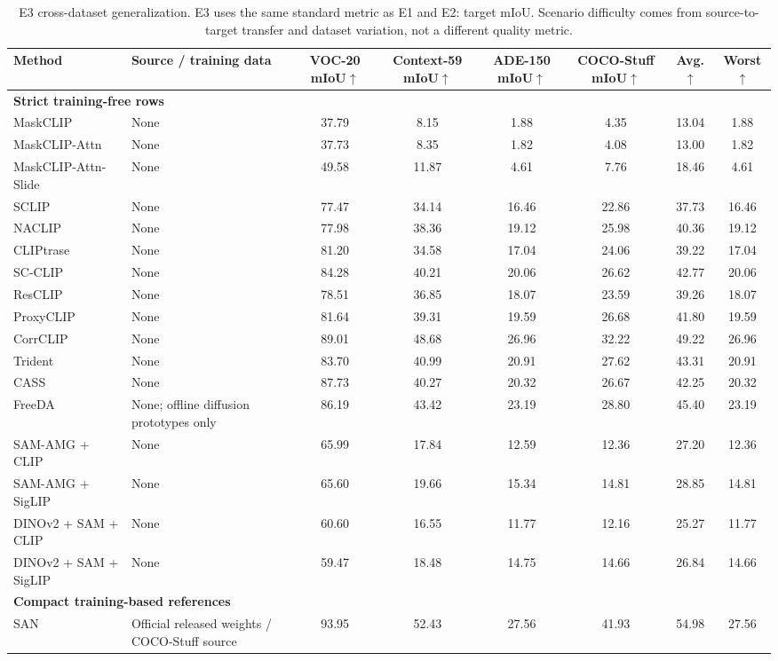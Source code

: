 \documentclass[11pt,a4paper]{article}
\newcommand{\up}{\ensuremath{\uparrow}}
\begin{document}
\begin{table}[H]
\centering
\scriptsize
\caption{E3 cross-dataset generalization. E3 uses the same standard metric as E1 and E2: target mIoU. Scenario difficulty comes from source-to-target transfer and dataset variation, not a different quality metric.}
\label{tab:e3-generalization}
\setlength{\tabcolsep}{2.5pt}
\begin{adjustbox}{max width=\textwidth}
\begin{tabular}{l p{} c c c c c c}
\toprule
Method & Source / training data & VOC-20 mIoU\up & Context-59 mIoU\up & ADE-150 mIoU\up & COCO-Stuff mIoU\up & Avg.\up & Worst\up \\
\midrule
\multicolumn{8}{l}{\textbf{Strict training-free rows}} \\
MaskCLIP & None & 37.79 & 8.15 & 1.88 & 4.35 & 13.04 & 1.88 \\
MaskCLIP-Attn & None & 37.73 & 8.35 & 1.82 & 4.08 & 13.00 & 1.82 \\
MaskCLIP-Attn-Slide & None & 49.58 & 11.87 & 4.61 & 7.76 & 18.46 & 4.61 \\
SCLIP & None & 77.47 & 34.14 & 16.46 & 22.86 & 37.73 & 16.46 \\
NACLIP & None & 77.98 & 38.36 & 19.12 & 25.98 & 40.36 & 19.12 \\
CLIPtrase & None & 81.20 & 34.58 & 17.04 & 24.06 & 39.22 & 17.04 \\
SC-CLIP & None & 84.28 & 40.21 & 20.06 & 26.62 & 42.77 & 20.06 \\
ResCLIP & None & 78.51 & 36.85 & 18.07 & 23.59 & 39.26 & 18.07 \\
ProxyCLIP & None & 81.64 & 39.31 & 19.59 & 26.68 & 41.80 & 19.59 \\
CorrCLIP & None & 89.01 & 48.68 & 26.96 & 32.22 & 49.22 & 26.96 \\
Trident & None & 83.70 & 40.99 & 20.91 & 27.62 & 43.31 & 20.91 \\
CASS & None & 87.73 & 40.27 & 20.32 & 26.67 & 42.25 & 20.32 \\
FreeDA & None; offline diffusion prototypes only & 86.19 & 43.42 & 23.19 & 28.80 & 45.40 & 23.19 \\
SAM-AMG + CLIP & None & 65.99 & 17.84 & 12.59 & 12.36 & 27.20 & 12.36 \\
SAM-AMG + SigLIP & None & 65.60 & 19.66 & 15.34 & 14.81 & 28.85 & 14.81 \\
DINOv2 + SAM + CLIP & None & 60.60 & 16.55 & 11.77 & 12.16 & 25.27 & 11.77 \\
DINOv2 + SAM + SigLIP & None & 59.47 & 18.48 & 14.75 & 14.66 & 26.84 & 14.66 \\
\midrule
\multicolumn{8}{l}{\textbf{Compact training-based references}} \\
SAN & Official released weights / COCO-Stuff source & 93.95 & 52.43 & 27.56 & 41.93 & 54.98 & 27.56 \\
\bottomrule
\end{tabular}
\end{adjustbox}
\end{table}
\end{document}
